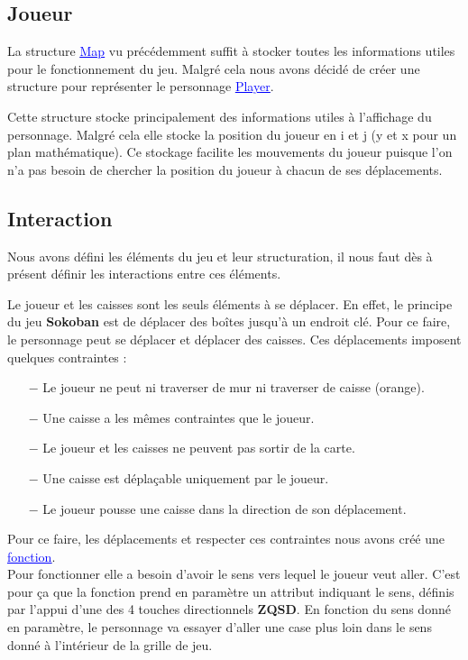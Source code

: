 \documentclass[french, 12pt]{article}
\begin{document}
   \subsection{Joueur}
       La structure \href{../doc/html/struct_map.html}{\textcolor{blue}{\underline{Map}}} vu précédemment suffit à stocker toutes les informations utiles pour le fonctionnement du jeu. Malgré cela nous avons décidé de créer une structure pour représenter le personnage \href{../doc/html/struct_player.html}{\textcolor{blue}{\underline{Player}}}.

       Cette structure stocke principalement des informations utiles à l'affichage du personnage. Malgré cela elle stocke la position du joueur en i et j (y et x pour un plan mathématique). Ce stockage facilite les mouvements du joueur puisque l'on n'a pas besoin de chercher la position du joueur à chacun de ses déplacements.


   \subsection{Interaction}
       Nous avons défini les éléments du jeu et leur structuration, il nous faut dès à présent définir les interactions entre ces éléments.

       Le joueur et les caisses sont les seuls éléments à se déplacer. En effet, le principe du jeu \textbf{Sokoban} est de déplacer des boîtes jusqu'à un endroit clé. Pour ce faire, le personnage peut se déplacer et déplacer des caisses. Ces déplacements imposent quelques contraintes :

       \begin{itemize}
           \item[$-$] Le joueur ne peut ni traverser de mur ni traverser de caisse (orange).
           \item[$-$] Une caisse a les mêmes contraintes que le joueur.
           \item[$-$] Le joueur et les caisses ne peuvent pas sortir de la carte.
           \item[$-$] Une caisse est déplaçable uniquement par le joueur.
           \item[$-$] Le joueur pousse une caisse dans la direction de son déplacement.
       \end{itemize}

       Pour ce faire, les déplacements et respecter ces contraintes nous avons créé une \href{../doc/html/move_8h.html}{\textcolor{blue}{\underline{fonction}}}. \\
       Pour fonctionner elle a besoin d'avoir le sens vers lequel le joueur veut aller. C'est pour ça que la fonction prend en paramètre un attribut indiquant le sens, définis par l'appui d'une des 4 touches directionnels \textbf{ZQSD}. En fonction du sens donné en paramètre, le personnage va essayer d'aller une case plus loin dans le sens donné à l'intérieur de la grille de jeu.\\
\end{document}
